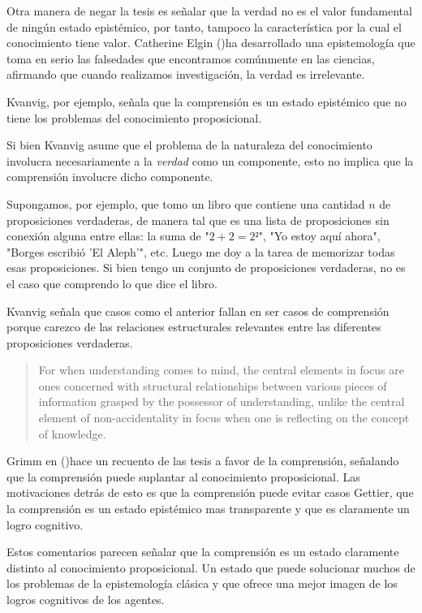 Otra manera de negar la tesis es señalar que la verdad no es el valor fundamental de ningún estado epistémico, por tanto, tampoco la característica por la cual el conocimiento tiene valor.
Catherine Elgin (\citeyear{elgin2004})ha desarrollado una epistemología que toma en serio las falsedades que encontramos comúnmente en las ciencias, afirmando que cuando realizamos investigación, la verdad es irrelevante.

Kvanvig, por ejemplo, señala que la comprensión es un estado epistémico que no tiene los problemas del conocimiento proposicional.

Si bien Kvanvig asume que el problema de la naturaleza del conocimiento involucra necesariamente a la \emph{verdad} como un componente, esto no implica que la comprensión involucre dicho componente.

Supongamos, por ejemplo, que tomo un libro que contiene una cantidad $n$ de proposiciones verdaderas, de manera tal que es una lista de proposiciones sin conexión alguna entre ellas: la suma de "$2+2 = 2²$", "Yo estoy aquí ahora", "Borges escribió 'El Aleph'", etc.
Luego me doy a la tarea de memorizar todas esas proposiciones.
Si bien tengo un conjunto de proposiciones verdaderas, no es el caso que comprendo lo que dice el libro.

Kvanvig señala que casos como el anterior fallan en ser casos de comprensión porque carezco de las relaciones estructurales relevantes entre las diferentes proposiciones verdaderas.

\begin{quote}
     For when understanding comes to mind, the central elements in focus are ones concerned with structural relationships between various pieces of information grasped by the possessor of understanding, unlike the central element of non-accidentality in focus when one is reflecting on the concept of knowledge. \parencite{kvanvig2009}
\end{quote}
   
Grimm en (\citeyear{grimm2012})hace un recuento de las tesis a favor de la comprensión, señalando que la comprensión puede suplantar al conocimiento proposicional.
Las motivaciones detrás de esto es que la comprensión puede evitar casos Gettier, que la comprensión es un estado epistémico mas transparente y que es claramente un logro cognitivo.

Estos comentarios parecen señalar que la comprensión es un estado claramente distinto al conocimiento proposicional.
Un estado que puede solucionar muchos de los problemas de la epistemología clásica y que ofrece una mejor imagen de los logros cognitivos de los agentes.

